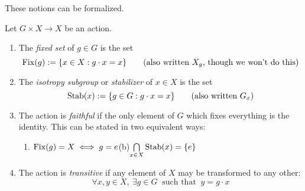 \goodbreak

These notions can be formalized.



\begin{defn}{}{}
Let $G\times X\to X$ be an action.
\begin{enumerate}
  \item The \emph{fixed set} of $g\in G$ is the set
  \[\operatorname{Fix}(g):=\{x\in X:g\cdot x=x\} \tag{also written $X_g$, though we won't do this}\]
  \item The \emph{isotropy subgroup} or \emph{stabilizer} of $x\in X$ is the set
  \[\operatorname{Stab}(x):=\{g\in G:g\cdot x=x\} \tag{also written $G_x$}\] 
  \item The action is \emph{faithful} if the only element of $G$ which fixes everything is the identity. This can be stated in two equivalent ways:
  \begin{enumerate}
    \item $\operatorname{Fix}(g)=X\iff g=e$\qquad\qquad\qquad (b)\lstsp$\bigcap\limits_{x\in X}\operatorname{Stab}(x)=\{e\}$
  \end{enumerate}
  \item The action is \emph{transitive} if any element of $X$ may be transformed to any other:
	\[\forall x,y\in X,\ \exists g\in G\ \text{ such that }\  y=g\cdot x\]
\end{enumerate}
\end{defn}

